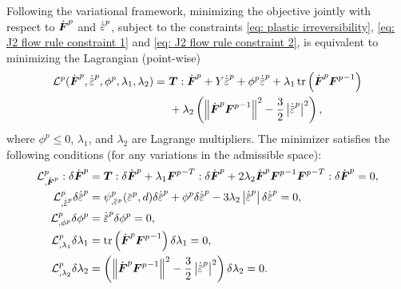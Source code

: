 Following the variational framework, minimizing the objective jointly with respect to $\dot{\boldsymbol{F}}^p$ and $\epdot$, subject to the constraints \eqref{eq: plastic irreversibility}, \eqref{eq: J2 flow rule constraint 1} and \eqref{eq: J2 flow rule constraint 2}, is equivalent to minimizing the Lagrangian (point-wise)
\begin{equation}
  \begin{aligned}
    \mathcal{L}^p(\dot{\defgrad}^p, \epdot, \phi^p, \lambda_1, \lambda_2) = & \ \bfT : \dot{\defgrad}^p + Y \epdot + \phi^p\epdot + \lambda_1\tr\left( \dot{\defgrad}^p{\defgrad^p}^{-1} \right) \\
                                                                            & \ + \lambda_2 \left( \norm{\dot{\defgrad}^p{\defgrad^p}^{-1}}^2 - \frac{3}{2} \abs{\epdot}^2 \right),
  \end{aligned}
\end{equation}
where $\phi^p \leqslant 0$, $\lambda_1$, and $\lambda_2$ are Lagrange multipliers. The minimizer satisfies the following conditions (for any variations in the admissible space):
\begin{subequations}
  \begin{align}
    \mathcal{L}^p_{, \dot{\defgrad}^p} : \delta \dot{\defgrad}^p & = \bfT : \delta \dot{\defgrad}^p + \lambda_1{\defgrad^p}^{-T} : \delta \dot{\defgrad}^p + 2\lambda_2\dot{\defgrad}^p{\defgrad^p}^{-1}{\defgrad^p}^{-T} : \delta \dot{\defgrad}^p = 0, \label{eq: KKT Fp} \\
    \mathcal{L}^p_{, \epdot}\delta \epdot                        & = \psi^p_{, \ep}(\ep, d) \delta \epdot + \phi^p \delta \epdot - 3 \lambda_2 \abs{\epdot} \delta \epdot = 0, \label{eq: KKT ep}                                                                           \\
    \mathcal{L}^p_{, \phi^p} \delta \phi^p                       & = \epdot \delta \phi^p = 0, \label{eq: KKT lambda1}                                                                                                                                                      \\
    \mathcal{L}^p_{, \lambda_1} \delta \lambda_1                 & = \tr\left( \dot{\defgrad}^p{\defgrad^p}^{-1} \right) \delta \lambda_1 = 0, \label{eq: KKT lambda2}                                                                                                      \\
    \mathcal{L}^p_{, \lambda_2} \delta \lambda_2                 & = \left( \norm{\dot{\defgrad}^p{\defgrad^p}^{-1}}^2 - \frac{3}{2} \abs{\epdot}^2 \right) \delta \lambda_2 = 0. \label{eq: KKT lambda3}
  \end{align}
\end{subequations}
